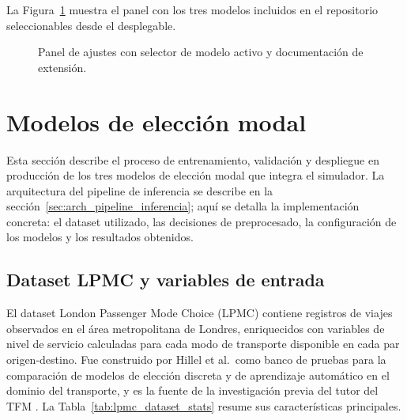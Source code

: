 La Figura~\ref{fig:panel_ajustes} muestra el panel con los tres modelos incluidos en el repositorio seleccionables desde el desplegable.

\begin{figure}[htbp]
  \centering
  \caption{Panel de ajustes con selector de modelo activo y documentación de extensión.}
  \label{fig:panel_ajustes}
\end{figure}

\section{Modelos de elección modal}
\label{sec:impl_lpmc}

Esta sección describe el proceso de entrenamiento, validación y despliegue en producción de los tres modelos de elección modal que integra el simulador. La arquitectura del pipeline de inferencia se describe en la sección~\ref{sec:arch_pipeline_inferencia}; aquí se detalla la implementación concreta: el dataset utilizado, las decisiones de preprocesado, la configuración de los modelos y los resultados obtenidos.

\subsection{Dataset LPMC y variables de entrada}
\label{subsec:impl_lpmc_dataset}

El dataset London Passenger Mode Choice (LPMC) \cite{Hillel2018LPMC,CSLPMC2019} contiene registros de viajes observados en el área metropolitana de Londres, enriquecidos con variables de nivel de servicio calculadas para cada modo de transporte disponible en cada par origen-destino. Fue construido por Hillel et al.\ como banco de pruebas para la comparación de modelos de elección discreta y de aprendizaje automático en el dominio del transporte, y es la fuente de la investigación previa del tutor del TFM \cite{MartinBaos2023Thesis,MartinBaos2023TRC}. La Tabla~\ref{tab:lpmc_dataset_stats} resume sus características principales.

